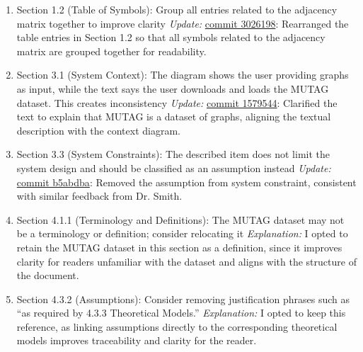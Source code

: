 \documentclass{article}
\begin{document}
\begin{enumerate}
    \item Section 1.2 (Table of Symbols): Group all entries related to the adjacency matrix together to improve clarity  
    \newline \textit{Update:} \href{https://github.com/Yuanqi-X/Re-ProtGNN/commit/3026198ef963e8147133dfdaea3d41bbbf2dfc58}{commit 3026198}: Rearranged the table entries in Section 1.2 so that all symbols related to the adjacency matrix are grouped together for readability.

    \item Section 3.1 (System Context): The diagram shows the user providing graphs as input, while the text says the user downloads and loads the MUTAG dataset. This creates inconsistency  
    \newline \textit{Update:} \href{https://github.com/Yuanqi-X/Re-ProtGNN/commit/1579544d443df994977cba95b5ffb2a6ff44fdb5}{commit 1579544}: Clarified the text to explain that MUTAG is a dataset of graphs, aligning the textual description with the context diagram.

    \item Section 3.3 (System Constraints): The described item does not limit the system design and should be classified as an assumption instead  
    \newline \textit{Update:} \href{https://github.com/Yuanqi-X/Re-ProtGNN/commit/b5abdba4e5394be1659cdb273f338eb027a96d34}{commit b5abdba}: Removed the assumption from system constraint, consistent with similar feedback from Dr. Smith.

    \item Section 4.1.1 (Terminology and Definitions): The MUTAG dataset may not be a terminology or definition; consider relocating it  
    \newline \textit{Explanation:} I opted to retain the MUTAG dataset in this section as a definition, since it improves clarity for readers unfamiliar with the dataset and aligns with the structure of the document.

    \item Section 4.3.2 (Assumptions): Consider removing justification phrases such as “as required by 4.3.3 Theoretical Models.”  
    \newline \textit{Explanation:} I opted to keep this reference, as linking assumptions directly to the corresponding theoretical models improves traceability and clarity for the reader.
\end{enumerate}
\end{document}
